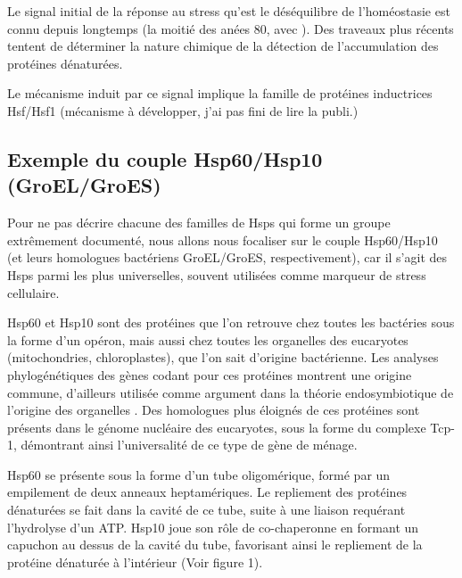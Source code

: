 Le signal initial de la réponse au stress qu'est le déséquilibre de l'homéostasie est connu depuis longtemps (la moitié des anées 80, avec \cite{ananthan1986}).
Des traveaux plus récents tentent de déterminer la nature chimique de la détection de l'accumulation des protéines dénaturées.

Le mécanisme induit par ce signal implique la famille de protéines inductrices Hsf/Hsf1 \cite{voellmy2004} (mécanisme à développer, j'ai pas fini de lire la publi.)



\subsection{Exemple du couple Hsp60/Hsp10 (GroEL/GroES)}

Pour ne pas décrire chacune des familles de Hsps qui forme un groupe extrêmement documenté, nous allons nous focaliser sur le couple Hsp60/Hsp10 (et leurs homologues bactériens GroEL/GroES, respectivement), car il s'agit des Hsps parmi les plus universelles, souvent utilisées comme marqueur de stress cellulaire.

Hsp60 et Hsp10 sont des protéines que l'on retrouve chez toutes les bactéries sous la forme d'un opéron, mais aussi chez toutes les organelles des eucaryotes (mitochondries, chloroplastes), que l'on sait d'origine bactérienne.
Les analyses phylogénétiques des gènes codant pour ces protéines montrent une origine commune, d'ailleurs utilisée comme argument dans la théorie endosymbiotique de l'origine des organelles \cite{gupta1995}.
Des homologues plus éloignés de ces protéines sont présents dans le génome nucléaire des eucaryotes, sous la forme du complexe Tcp-1, démontrant ainsi l'universalité de ce type de gène de ménage.


Hsp60 se présente sous la forme d'un tube oligomérique, formé par un empilement de deux anneaux heptamériques.
Le repliement des protéines dénaturées se fait dans la cavité de ce tube, suite à une liaison requérant l'hydrolyse d'un ATP.
Hsp10 joue son rôle de co-chaperonne en formant un capuchon au dessus de la cavité du tube, favorisant ainsi le repliement de la protéine dénaturée à l'intérieur (Voir figure 1).




